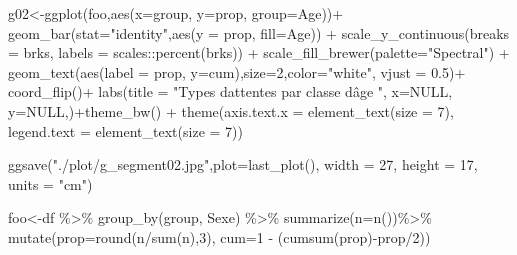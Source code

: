 \documentclass[
]{book}
\newenvironment{Shaded}{\begin{snugshade}}{\end{snugshade}}
\newcommand{\AttributeTok}[1]{\textcolor[rgb]{0.77,0.63,0.00}{#1}}
\newcommand{\ConstantTok}[1]{\textcolor[rgb]{0.00,0.00,0.00}{#1}}
\newcommand{\DecValTok}[1]{\textcolor[rgb]{0.00,0.00,0.81}{#1}}
\newcommand{\FloatTok}[1]{\textcolor[rgb]{0.00,0.00,0.81}{#1}}
\newcommand{\FunctionTok}[1]{\textcolor[rgb]{0.00,0.00,0.00}{#1}}
\newcommand{\NormalTok}[1]{#1}
\newcommand{\OtherTok}[1]{\textcolor[rgb]{0.56,0.35,0.01}{#1}}
\newcommand{\SpecialCharTok}[1]{\textcolor[rgb]{0.00,0.00,0.00}{#1}}
\newcommand{\StringTok}[1]{\textcolor[rgb]{0.31,0.60,0.02}{#1}}
\begin{document}
\begin{Shaded}
\begin{Highlighting}[]
\NormalTok{g02}\OtherTok{\textless{}{-}}\FunctionTok{ggplot}\NormalTok{(foo,}\FunctionTok{aes}\NormalTok{(}\AttributeTok{x=}\NormalTok{group, }\AttributeTok{y=}\NormalTok{prop, }\AttributeTok{group=}\NormalTok{Age))}\SpecialCharTok{+}
  \FunctionTok{geom\_bar}\NormalTok{(}\AttributeTok{stat=}\StringTok{"identity"}\NormalTok{,}\FunctionTok{aes}\NormalTok{(}\AttributeTok{y =}\NormalTok{ prop, }\AttributeTok{fill=}\NormalTok{Age)) }\SpecialCharTok{+} 
 \FunctionTok{scale\_y\_continuous}\NormalTok{(}\AttributeTok{breaks =}\NormalTok{ brks, }\AttributeTok{labels =}\NormalTok{ scales}\SpecialCharTok{::}\FunctionTok{percent}\NormalTok{(brks)) }\SpecialCharTok{+}
  \FunctionTok{scale\_fill\_brewer}\NormalTok{(}\AttributeTok{palette=}\StringTok{"Spectral"}\NormalTok{) }\SpecialCharTok{+} \FunctionTok{geom\_text}\NormalTok{(}\FunctionTok{aes}\NormalTok{(}\AttributeTok{label =}\NormalTok{ prop, }\AttributeTok{y=}\NormalTok{cum),}\AttributeTok{size=}\DecValTok{2}\NormalTok{,}\AttributeTok{color=}\StringTok{"white"}\NormalTok{, }\AttributeTok{vjust =} \FloatTok{0.5}\NormalTok{)}\SpecialCharTok{+}
  \FunctionTok{coord\_flip}\NormalTok{()}\SpecialCharTok{+}
  \FunctionTok{labs}\NormalTok{(}\AttributeTok{title =} \StringTok{"Types d\textquotesingle{}attentes par classe d\textquotesingle{}âge "}\NormalTok{, }
       \AttributeTok{x=}\ConstantTok{NULL}\NormalTok{, }\AttributeTok{y=}\ConstantTok{NULL}\NormalTok{,)}\SpecialCharTok{+}\FunctionTok{theme\_bw}\NormalTok{()  }\SpecialCharTok{+}
  \FunctionTok{theme}\NormalTok{(}\AttributeTok{axis.text.x =} \FunctionTok{element\_text}\NormalTok{(}\AttributeTok{size =} \DecValTok{7}\NormalTok{), }\AttributeTok{legend.text =} \FunctionTok{element\_text}\NormalTok{(}\AttributeTok{size =} \DecValTok{7}\NormalTok{)) }



\FunctionTok{ggsave}\NormalTok{(}\StringTok{"./plot/g\_segment02.jpg"}\NormalTok{,}\AttributeTok{plot=}\FunctionTok{last\_plot}\NormalTok{(), }\AttributeTok{width =} \DecValTok{27}\NormalTok{, }\AttributeTok{height =} \DecValTok{17}\NormalTok{, }\AttributeTok{units =} \StringTok{"cm"}\NormalTok{)}


\NormalTok{foo}\OtherTok{\textless{}{-}}\NormalTok{df }\SpecialCharTok{\%\textgreater{}\%} 
  \FunctionTok{group\_by}\NormalTok{(group, Sexe) }\SpecialCharTok{\%\textgreater{}\%} 
   \FunctionTok{summarize}\NormalTok{(}\AttributeTok{n=}\FunctionTok{n}\NormalTok{())}\SpecialCharTok{\%\textgreater{}\%}
  \FunctionTok{mutate}\NormalTok{(}\AttributeTok{prop=}\FunctionTok{round}\NormalTok{(n}\SpecialCharTok{/}\FunctionTok{sum}\NormalTok{(n),}\DecValTok{3}\NormalTok{), }\AttributeTok{cum=}\DecValTok{1} \SpecialCharTok{{-}}\NormalTok{ (}\FunctionTok{cumsum}\NormalTok{(prop)}\SpecialCharTok{{-}}\NormalTok{prop}\SpecialCharTok{/}\DecValTok{2}\NormalTok{))}


\end{Highlighting}
\end{Shaded}
\end{document}
